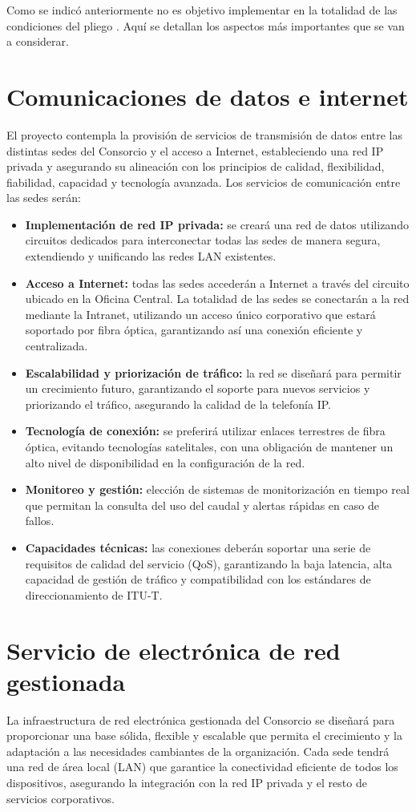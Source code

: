 Como se indicó anteriormente no es objetivo implementar en la totalidad de las condiciones del pliego \cite{expediente0062020}. Aquí se detallan los aspectos más importantes que se van a considerar.

\section{Comunicaciones de datos e internet}
El proyecto contempla la provisión de servicios de transmisión de datos entre las distintas sedes del Consorcio y el acceso a Internet, estableciendo una red IP privada y asegurando su alineación con 
los principios de calidad, flexibilidad, fiabilidad, capacidad y tecnología avanzada. Los servicios de comunicación entre las sedes serán:
\begin{itemize}
	\item \textbf{Implementación de red IP privada:} se creará una red de datos utilizando circuitos dedicados para interconectar todas las sedes de manera segura, extendiendo y unificando las redes LAN existentes.
	\item \textbf{Acceso a Internet:} todas las sedes accederán a Internet a través del circuito ubicado en la Oficina Central. La totalidad de las sedes se conectarán a la red mediante la Intranet, utilizando un acceso único corporativo que estará soportado por fibra óptica, garantizando así una conexión eficiente y centralizada.
	\item \textbf{Escalabilidad y priorización de tráfico:} la red se diseñará para permitir un crecimiento futuro, garantizando el soporte para nuevos servicios y priorizando el tráfico, asegurando la calidad de la telefonía IP.
	\item \textbf{Tecnología de conexión:} se preferirá utilizar enlaces terrestres de fibra óptica, evitando tecnologías satelitales, con una obligación de mantener un alto nivel de disponibilidad en la configuración de la red.
	\item \textbf{Monitoreo y gestión:} elección de sistemas de monitorización en tiempo real que permitan la consulta del uso del caudal y alertas rápidas en caso de fallos.
	\item \textbf{Capacidades técnicas:} las conexiones deberán soportar una serie de requisitos de calidad del servicio (QoS), garantizando la baja latencia, alta capacidad de gestión de tráfico y compatibilidad con los estándares de direccionamiento de ITU-T.
\end{itemize}
\section{Servicio de electrónica de red gestionada}
\label{sec:servicio_electronica_red}
La infraestructura de red electrónica gestionada del Consorcio se diseñará para proporcionar una base sólida, flexible y escalable que permita el crecimiento y la adaptación a las necesidades cambiantes de la organización. 
Cada sede tendrá una red de área local (LAN) que garantice la conectividad eficiente de todos los dispositivos, asegurando la integración con la red IP privada y el resto de servicios corporativos.

